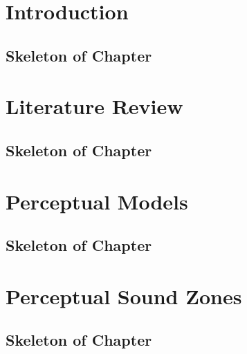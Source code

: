 \documentclass[11pt,twoside,openright,titlepage]{ce}
\begin{document}
\frontmatter
\makecover
\maketitle
\makesignature


\tableofcontents
\listoffigures
\listoftables
\mainmatter

\chapter{Introduction}
\begin{tcolorbox}
\section*{Skeleton of Chapter}

\end{tcolorbox}

\chapter{Literature Review}
\begin{tcolorbox}
\section*{Skeleton of Chapter}

\end{tcolorbox}

\chapter{Perceptual Models}
\begin{tcolorbox}
\section*{Skeleton of Chapter}

\end{tcolorbox}

\chapter{Perceptual Sound Zones}
\begin{tcolorbox}
\section*{Skeleton of Chapter}

\end{tcolorbox}
\newpage

\newpage

\end{document}
